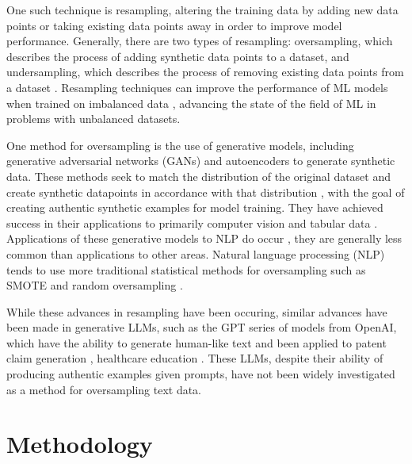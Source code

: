 \documentclass[runningheads]{llncs}
\begin{document}
One such technique is resampling, altering the training data by adding new data points or taking existing data points away in order to improve model performance. Generally, there are two types of resampling: oversampling, which describes the process of adding synthetic data points to a dataset, and undersampling, which describes the process of removing existing data points from a dataset \cite{shelke}. Resampling techniques can improve the performance of ML models when trained on imbalanced data \cite{lee} \cite{khushi}, advancing the state of the field of ML in problems with unbalanced datasets.

One method for oversampling is the use of generative models, including generative adversarial networks (GANs) and autoencoders to generate synthetic data. These methods seek to match the distribution of the original dataset and create synthetic datapoints in accordance with that distribution \cite{hao}, with the goal of creating authentic synthetic examples for model training. They have achieved success in their applications to primarily computer vision and tabular data \cite{hao} \cite{engelmann} \cite{bellinger} \cite{dai}. Applications of these generative models to NLP do occur \cite{phung}, they are generally less common than applications to other areas. Natural language processing (NLP) tends to use more traditional statistical methods for oversampling such as SMOTE and random oversampling \cite{wijaya} \cite{glazkova}.

While these advances in resampling have been occuring, similar advances have been made in generative LLMs, such as the GPT series of models from OpenAI, which have the ability to generate human-like text \cite{floridi} and been applied to patent claim generation \cite{hsiang}, healthcare education \cite{sallam}. These LLMs, despite their ability of producing authentic examples given prompts, have not been widely investigated as a method for oversampling text data.

\section{Methodology}


\end{document}
